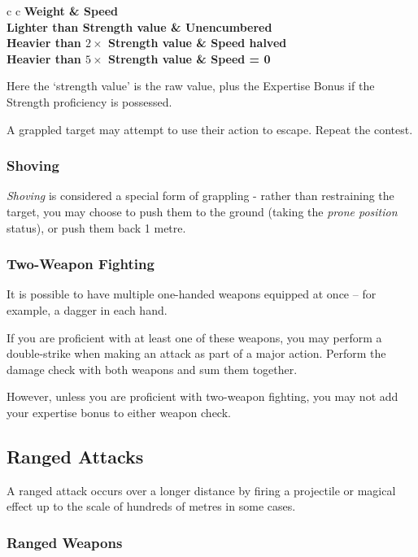 \begin{center}
\begin{rndtable}{c c}
\bf Weight	&	\bf Speed
\\
Lighter than Strength value & Unencumbered
\\
Heavier than $2 \times$ Strength value	&	Speed halved
\\
Heavier than $ 5 \times$ Strength value	&	Speed = 0
\end{rndtable}
\end{center}

Here the `strength value' is the raw \attPhys{} value, plus the Expertise Bonus if the Strength proficiency is possessed. 

A grappled target may attempt to use their action to escape. Repeat the contest. 

\subsubsection{Shoving}

{\it Shoving} is considered a special form of grappling - rather than restraining the target, you may choose to push them to the ground (taking the {\it prone position} status), or push them back 1 metre. 

\subsubsection{Two-Weapon Fighting}

It is possible to have multiple one-handed weapons equipped at once -- for example, a dagger in each hand. 

If you are proficient with at least one of these weapons, you may perform a double-strike when making an attack as part of a major action. Perform the damage check with both weapons and sum them together. 

However, unless you are proficient with two-weapon fighting, you may not add your expertise bonus to either weapon check. 

\subsection{Ranged Attacks}

A ranged attack occurs over a longer distance by firing a projectile or magical effect up to the scale of hundreds of metres in some cases. 

\subsubsection{Ranged Weapons}

